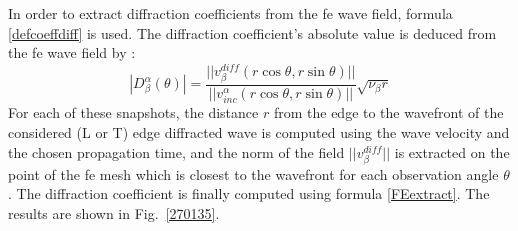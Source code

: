 In order to extract diffraction coefficients from the \acrshort{fe} wave field, formula \eqref{defcoeffdiff} is used. The diffraction coefficient's absolute value is deduced from the \acrshort{fe} wave field by :
\begin{equation}
|D_{\beta}^{\alpha}(\theta)|=\frac{||v^{diff}_{\beta}(r\cos\theta,r\sin\theta)||}{||v_{inc}^{\alpha}(r\cos\theta,r\sin\theta)||}\sqrt{\nu_{\beta}r}
\label{FEextract}
\end{equation}
For each of these snapshots, the distance $r$ from the edge to the wavefront of the considered (L or T) edge diffracted wave is computed using the wave velocity and the chosen propagation time, and the norm of the field $||v^{diff}_{\beta}||$ is extracted on the point of the \acrshort{fe} mesh which is closest to the wavefront for each observation angle $\theta$. The diffraction coefficient is finally computed using formula \eqref{FEextract}. The results are shown in Fig.~\ref{270135}.

